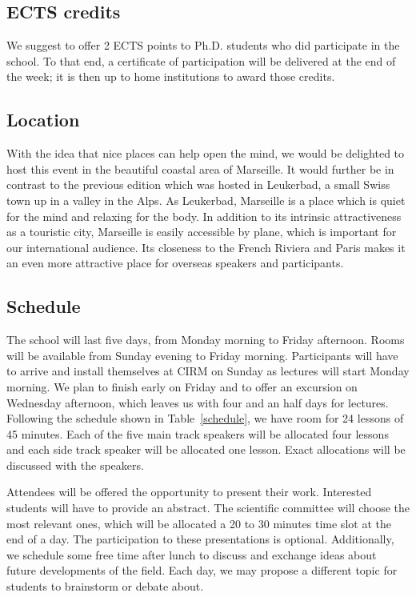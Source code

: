 \documentclass[a4paper]{scrartcl}
\begin{document}
\subsection{ECTS credits}

We suggest to offer 2 ECTS points to Ph.D. students who did participate in the
school. To that end, a certificate of participation will be delivered at the end
of the week; it is then up to home institutions to award those credits.

\subsection{Location}

With the idea that nice places can help open the mind, we would be delighted to
host this event in the beautiful coastal area of Marseille. It would further be
in contrast to the previous edition which was hosted in Leukerbad, a small Swiss
town up in a valley in the Alps. As Leukerbad, Marseille is a place which is
quiet for the mind and relaxing for the body. 
In addition to its intrinsic attractiveness as a touristic city, Marseille is
easily accessible by plane, which is important for our international audience.
Its closeness to the French Riviera and Paris makes it an even more attractive
place for overseas speakers and participants.

\subsection{Schedule}

The school will last five days, from Monday morning to Friday afternoon. Rooms
will be available from Sunday evening to Friday morning. Participants will have
to arrive and install themselves at CIRM on Sunday as lectures will start Monday
morning. We plan to finish early on Friday and to offer an excursion on
Wednesday afternoon, which leaves us with four and an half days for lectures.
Following the schedule shown in Table~\ref{schedule}, we have room for 24
lessons of 45 minutes. Each of the five main track speakers will be allocated
four lessons and each side track speaker will be allocated one lesson.
Exact allocations will be discussed with the speakers.

Attendees will be offered the opportunity to present their work. Interested
students will have to provide an abstract. The scientific committee will choose
the most relevant ones, which will be allocated a 20 to 30 minutes time slot at
the end of a day. The participation to these presentations is optional.
Additionally, we schedule some free time after lunch to discuss and exchange
ideas about future developments of the field. Each day, we may propose a
different topic for students to brainstorm or debate about.
\end{document}
